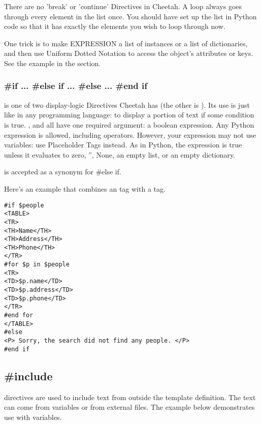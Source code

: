 There are no 'break' or 'continue' Directives in Cheetah.  A  loop
always goes through every element in the list once.  You should have set up the
list in Python code so that it has exactly the elements you wish to loop through
now.

One trick is to make EXPRESSION a list of instances or a list of dictionaries,
and then use Uniform Dotted Notation to access the object's attributes or keys.
See the example in the  section.

\subsubsection{\#if ... \#else if ... \#else ... \#end if}

 is one of two display-logic Directives Cheetah has (the other is
).  Its use is just like in any programming language: to display
a portion of text if some condition is true.  
,  and  all have one required argument:
a boolean expression.  Any Python expression is allowed, including operators.
However, your expression may not use variables:  use Placeholder Tags instead.
As in Python, the expression is true unless it evaluates to zero, '', None, an
empty list, or an empty dictionary.

 is accepted as a synonym for {\#else if}.

Here's an example that combines an  tag with a  tag.

\begin{verbatim}
#if $people
<TABLE>
<TR>
<TH>Name</TH>
<TH>Address</TH>
<TH>Phone</TH>
</TR>
#for $p in $people
<TR>
<TD>$p.name</TD>
<TD>$p.address</TD>
<TD>$p.phone</TD>
</TR>
#end for
</TABLE>
#else
<P> Sorry, the search did not find any people. </P>
#end if
\end{verbatim}



\subsection{\#include}

 directives are used to include text from outside the template
definition.  The text can come from  variables or from
external files.  The example below demonstrates use with 
variables.

